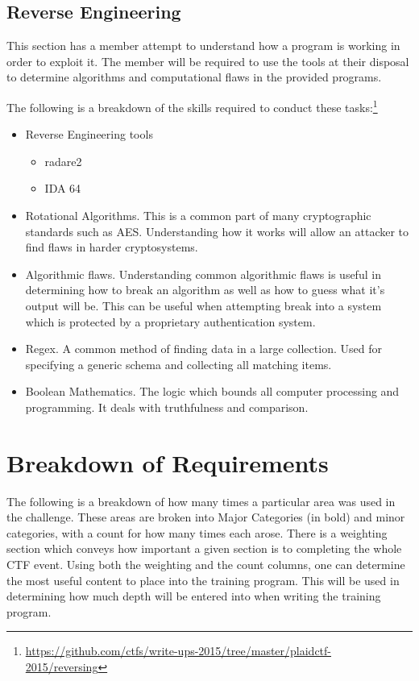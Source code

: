 \documentclass[a4paper,11pt]{report}
\begin{document}
		\subsection{Reverse Engineering}
			This section has a member attempt to understand how a program is working in order to exploit it. 
			The member will be required to use the tools at their disposal to determine algorithms and computational flaws in the provided programs. 

			The following is a breakdown of the skills required to conduct these tasks:\footnote{\url{https://github.com/ctfs/write-ups-2015/tree/master/plaidctf-2015/reversing}}
			\begin{itemize}
				\item Reverse Engineering tools
					\begin{itemize}
						\item radare2
						\item IDA 64
					\end{itemize}
				\item Rotational Algorithms.
					This is a common part of many cryptographic standards such as AES. 
					Understanding how it works will allow an attacker to find flaws in harder cryptosystems.
				\item Algorithmic flaws. 
					Understanding common algorithmic flaws is useful in determining how to break an algorithm as well as how to guess what it's output will be. 
					This can be useful when attempting break into a system which is protected by a proprietary authentication system. 
				\item Regex.
					A common method of finding data in a large collection. 
					Used for specifying a generic schema and collecting all matching items. 
				\item Boolean Mathematics. 
					The logic which bounds all computer processing and programming. 
					It deals with truthfulness and comparison. 
			\end{itemize}
	
	\section{Breakdown of Requirements}
	 	The following is a breakdown of how many times a particular area was used in the challenge. 
		These areas are broken into Major Categories (in bold) and minor categories, with a count for how many times each arose. 
		There is a weighting section which conveys how important a given section is to completing the whole CTF event. 
		Using both the weighting and the count columns, one can determine the most useful content to place into the training program. 
		This will be used in determining how much depth will be entered into when writing the training program.
\end{document}
